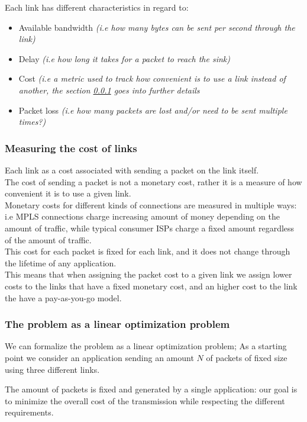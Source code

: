 Each link has different characteristics in regard to:
\begin{itemize}
	\item Available bandwidth \textit{(i.e how many bytes can be sent per second through the link)}
	\item Delay \textit{(i.e how long it takes for a packet to reach the sink)}
	\item Cost \textit{(i.e a metric used to track how convenient is to use a link instead of another, the section \ref{link_cost} goes into further details}
	\item Packet loss \textit{(i.e how many packets are lost and/or need to be sent multiple times?)}
\end{itemize} 



\subsubsection{Measuring the cost of links} \label{link_cost}
Each link as a cost associated with sending a packet on the link itself. \\
The cost of sending a packet is not a monetary cost, rather it is a measure of how convenient it is to use a given link. \\
Monetary costs for different kinds of connections are measured in multiple ways: i.e   MPLS connections charge increasing amount of money depending on the amount of traffic, while typical consumer ISPs charge a fixed amount regardless of the amount of traffic. \\
This cost for each packet is fixed for each link, and it does not change through the lifetime of any application. \\
This means that when assigning the packet cost to a given link we assign lower costs to the links that have a fixed monetary cost, and an higher cost to the link the have a pay-as-you-go model.


	
	\subsubsection{The problem as a linear optimization problem}
	
	We can formalize the problem as a linear optimization problem;
	As a starting point we consider an application sending an amount $N$ of packets of fixed size using three different links.
	
	The amount of packets is fixed and generated by a single application: our goal is to minimize the overall cost of the transmission while respecting the different requirements.
	
